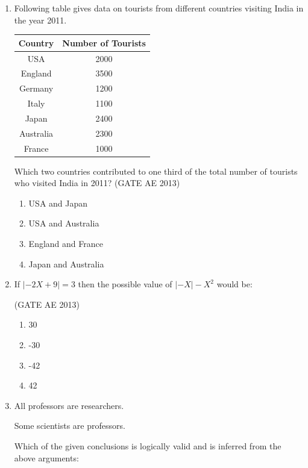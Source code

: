 \documentclass[journal,12pt,onecolumn]{IEEEtran}
\theoremstyle{remark}
\begin{document}
\begin{flushleft}
\begin{enumerate}
\item Following table gives data on tourists from different countries visiting India in the year 2011. 
\begin{center}
\begin{tabular}{|c|c|}
\hline
\textbf{Country} & \textbf{Number of Tourists} \\
\hline
USA & 2000 \\
England & 3500 \\
Germany & 1200 \\
Italy & 1100 \\
Japan & 2400 \\
Australia & 2300 \\
France & 1000 \\
\hline
\end{tabular}
\end{center}

Which two countries contributed to one third of the total number of tourists who visited India in 2011? \hfill(GATE AE 2013)

\begin{multicols}{2}
\begin{enumerate}
\item USA and Japan
\item USA and Australia
\item England and France
\item Japan and Australia
\end{enumerate}
\end{multicols}


\item If $\lvert -2X + 9 \rvert = 3$ then the possible value of $\lvert -X \rvert - X^2$ would be: 

\hfill(GATE AE 2013)
\begin{multicols}{2}
\begin{enumerate}
\item 30
\item -30
\item -42
\item 42
\end{enumerate}
\end{multicols}

\item All professors are researchers. 

Some scientists are professors. 

Which of the given conclusions is logically valid and is inferred from the above arguments: 


\end{enumerate}
\end{flushleft}
\end{document}
